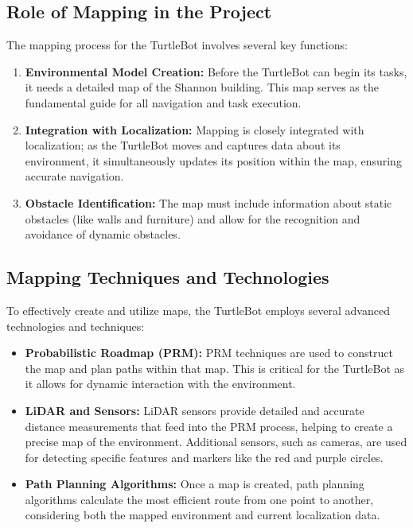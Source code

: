 \documentclass{article}
\begin{document}
	\subsection{Role of Mapping in the Project}
	The mapping process for the TurtleBot involves several key functions:
	\begin{enumerate}
		\item \textbf{Environmental Model Creation:} Before the TurtleBot can begin its tasks, it needs a detailed map of the Shannon building. This map serves as the fundamental guide for all navigation and task execution.
		\item \textbf{Integration with Localization:} Mapping is closely integrated with localization; as the TurtleBot moves and captures data about its environment, it simultaneously updates its position within the map, ensuring accurate navigation.
		\item \textbf{Obstacle Identification:} The map must include information about static obstacles (like walls and furniture) and allow for the recognition and avoidance of dynamic obstacles.
	\end{enumerate}
	
	\subsection{Mapping Techniques and Technologies}
	To effectively create and utilize maps, the TurtleBot employs several advanced technologies and techniques:
	\begin{itemize}
		\item \textbf{Probabilistic Roadmap (PRM):} PRM techniques are used to construct the map and plan paths within that map. This is critical for the TurtleBot as it allows for dynamic interaction with the environment.
		\item \textbf{LiDAR and Sensors:} LiDAR sensors provide detailed and accurate distance measurements that feed into the PRM process, helping to create a precise map of the environment. Additional sensors, such as cameras, are used for detecting specific features and markers like the red and purple circles.
		\item \textbf{Path Planning Algorithms:} Once a map is created, path planning algorithms calculate the most efficient route from one point to another, considering both the mapped environment and current localization data.
	\end{itemize}
	
\end{document}
